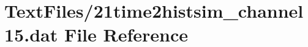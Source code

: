 \hypertarget{21time2histsim__channel15_8dat}{}\section{Text\+Files/21time2histsim\+\_\+channel15.dat File Reference}
\label{21time2histsim__channel15_8dat}
